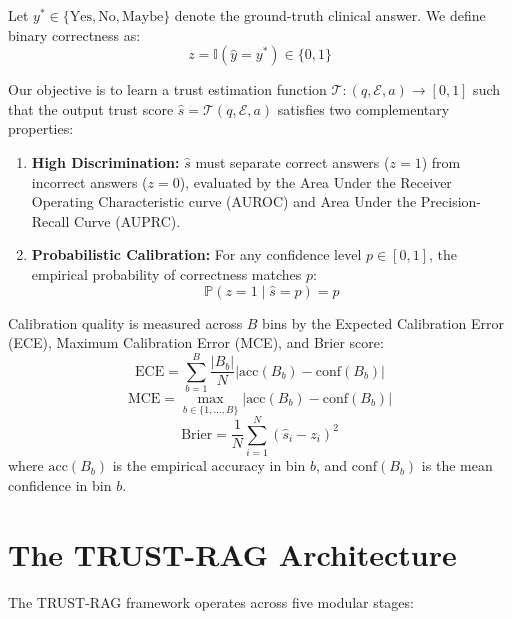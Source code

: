 \documentclass[journal,10pt]{IEEEtran}
\begin{document}
Let $y^* \in \{\text{Yes}, \text{No}, \text{Maybe}\}$ denote the ground-truth clinical answer. We define binary correctness as:
\begin{equation}
z = \mathbb{I}(\hat{y} = y^*) \in \{0, 1\}
\end{equation}

Our objective is to learn a trust estimation function $\mathcal{T}: (q, \mathcal{E}, a) \to [0, 1]$ such that the output trust score $\hat{s} = \mathcal{T}(q, \mathcal{E}, a)$ satisfies two complementary properties:
\begin{enumerate}
    \item \textbf{High Discrimination:} $\hat{s}$ must separate correct answers ($z=1$) from incorrect answers ($z=0$), evaluated by the Area Under the Receiver Operating Characteristic curve (AUROC) and Area Under the Precision-Recall Curve (AUPRC).
    \item \textbf{Probabilistic Calibration:} For any confidence level $p \in [0, 1]$, the empirical probability of correctness matches $p$:
    \begin{equation}
    \mathbb{P}(z = 1 \mid \hat{s} = p) = p
    \end{equation}
\end{enumerate}

Calibration quality is measured across $B$ bins by the Expected Calibration Error (ECE), Maximum Calibration Error (MCE), and Brier score:
\begin{equation}
\text{ECE} = \sum_{b=1}^B \frac{|B_b|}{N} |\text{acc}(B_b) - \text{conf}(B_b)|
\end{equation}
\begin{equation}
\text{MCE} = \max_{b \in \{1,\dots,B\}} |\text{acc}(B_b) - \text{conf}(B_b)|
\end{equation}
\begin{equation}
\text{Brier} = \frac{1}{N} \sum_{i=1}^N (\hat{s}_i - z_i)^2
\end{equation}
where $\text{acc}(B_b)$ is the empirical accuracy in bin $b$, and $\text{conf}(B_b)$ is the mean confidence in bin $b$.

\section{The TRUST-RAG Architecture}
The TRUST-RAG framework operates across five modular stages:
\end{document}
